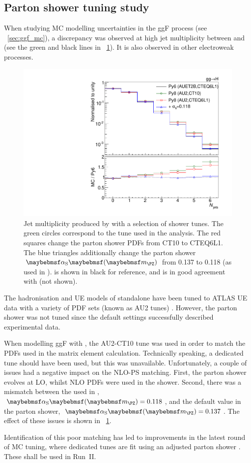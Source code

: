 \subsection{Parton shower tuning study}
\label{sec:mc:ps_tuning}

When studying MC modelling uncertainties in the ggF process (see \Section~\ref{sec:ggf_mc}), 
a discrepancy was observed at high jet multiplicity between  
and  (see the green and black lines in 
\Figure~\ref{fig:mc:ps_tuning}). It is also observed in other electroweak processes.

\begin{figure}[t]
	\includegraphics[width=\smallfigwidth]{tex/signal/matching}
	\caption{Jet multiplicity produced by  with a selection 
	of shower tunes. The green circles correspond to the tune used in the analysis. The red 
	squares change the parton shower PDFs from CT10 to CTEQ6L1. The blue triangles 
	additionally change the parton shower $\alphaS\parenths{\mZ}$ from 0.137 to 0.118 (as 
	used in \powhegbox).  is shown in black for 
	reference, and is in good agreement with \meps{\powhegbox}{\fherwig} (not shown).}
	\label{fig:mc:ps_tuning}
\end{figure}

The hadronisation and UE models of standalone  have been tuned to ATLAS 
UE data with a variety of PDF sets (known as AU2 tunes) \cite{ATLAS:tune:2012}.
However, the parton shower was not tuned since the default settings successfully described 
experimental data. 

When modelling ggF with \powhegbox, the AU2-CT10 tune was used in order to match the 
PDFs used in the matrix element calculation. Technically speaking, a dedicated 
 tune should have been used, but this was unavailable. 
Unfortunately, a couple of issues had a negative impact on the NLO-PS matching. First, 
the parton shower evolves \alphaS at LO, whilst NLO PDFs were used in the shower. 
Second, there was a mismatch between the \alphaS used in \powhegbox, 
$\alphaS\parenths{\mZ} = 0.118$, and the default value in the parton shower, 
$\alphaS\parenths{\mZ} = 0.137$. The effect of these issues is shown in 
\Figure~\ref{fig:mc:ps_tuning}.

Identification of this poor matching has led to improvements in the latest round of MC 
tuning, where dedicated  tunes are fit using an adjusted 
parton shower \cite{ATLAS:tune:2013}. These shall be used in Run~II.


